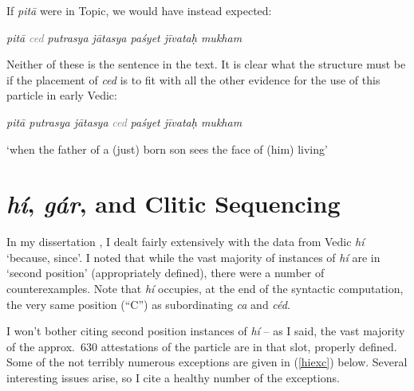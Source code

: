 \documentclass[output=paper,
modfonts
]{LSP/langsci}
\begin{document}
If \textit{pitā} were in Topic, we would have instead expected:

\vspace*{2ex}
\begin{exe}\ex
{\ob} \textit{pitā}{\cb} {\ob} {\textcolor{gray}{\textit{ced}}} {\ob}\textit{putrasya  jātasya paśyet jīvataḥ mukham}{\cb}{\cb} 
\end{exe}


\noindent Neither of these is the sentence in the text. It is clear what the structure must be if the placement of \textit{ced}
is to fit with all the other evidence for the use of this particle in early Vedic:

\begin{exe}\ex
{\ob} \textit{pitā putrasya jātasya}{\cb} {\ob} {\textcolor{gray}{\textit{ced}}} {\ob}\textit{paśyet  jīvataḥ mukham}{\cb}{\cb} 

`when the father of a (just) born son sees the face of (him) living'
\end{exe}

\section{\textit{hí}, \textit{gár}, and Clitic Sequencing}

In my dissertation \citep{hale1987}, I dealt fairly extensively with the data from Vedic \textit{hí}
`because, since'. I noted that while the vast majority of instances of \textit{hí} are in `second position' (appropriately
defined), there were a number of counterexamples. Note that \textit{hí} occupies, at the end of the syntactic computation,
the very same position (``C'') as subordinating \textit{ca} and \textit{céd}.

I won't bother citing second position instances of \textit{hí} -- as I said,
the vast majority of the approx.\ 630 attestations of the particle are in that slot, properly defined. Some of the
not terribly numerous exceptions are given in (\ref{hiexc}) below. Several interesting issues arise, so I cite a
healthy number of the exceptions.
\end{document}

